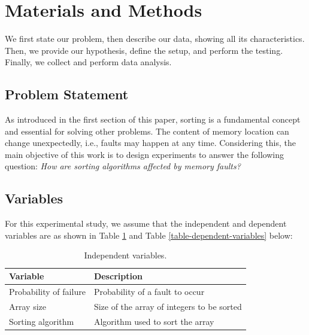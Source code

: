 \section{Materials and Methods}

We first state our problem, then describe our data, showing all its characteristics. Then, we provide our hypothesis, define the setup, and perform the testing. Finally, we collect and perform data analysis.

\subsection{Problem Statement}

As introduced in the first section of this paper, sorting is a fundamental concept and essential for solving other problems. The content of memory location can change unexpectedly, i.e., faults may happen at any time. Considering this, the main objective of this work is to design experiments to answer the following question: \textit{How are sorting algorithms affected by memory faults?}

\subsection{Variables}

For this experimental study, we assume that the independent and dependent variables are as shown in Table \ref{table-independent-variables} and Table \ref{table-dependent-variables} below:

\begin{table}[H]
    \caption{Independent variables.}
    \begin{center}
    \begin{tabular}{|l|l|}
    \hline
    \textbf{Variable} & \textbf{Description} \\
    \hline
    Probability of failure & Probability of a fault to occur \\
    \hline
    Array size & Size of the array of integers to be sorted \\
    \hline
    Sorting algorithm & Algorithm used to sort the array \\
    \hline
    \end{tabular}
    \label{table-independent-variables}
    \end{center}
\end{table}

